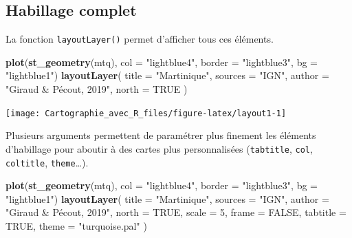 \documentclass[]{book}
\newenvironment{Shaded}{\begin{snugshade}}{\end{snugshade}}
\newcommand{\KeywordTok}[1]{\textcolor[rgb]{0.13,0.29,0.53}{\textbf{#1}}}
\newcommand{\DataTypeTok}[1]{\textcolor[rgb]{0.13,0.29,0.53}{#1}}
\newcommand{\DecValTok}[1]{\textcolor[rgb]{0.00,0.00,0.81}{#1}}
\newcommand{\StringTok}[1]{\textcolor[rgb]{0.31,0.60,0.02}{#1}}
\newcommand{\OtherTok}[1]{\textcolor[rgb]{0.56,0.35,0.01}{#1}}
\newcommand{\NormalTok}[1]{#1}
\begin{document}
\subsection{Habillage complet}\label{habillage-complet}

La fonction \texttt{layoutLayer()} permet d'afficher tous ces éléments.

\begin{Shaded}
\begin{Highlighting}[]
\KeywordTok{plot}\NormalTok{(}\KeywordTok{st_geometry}\NormalTok{(mtq), }\DataTypeTok{col =} \StringTok{"lightblue4"}\NormalTok{, }\DataTypeTok{border =} \StringTok{"lightblue3"}\NormalTok{, }
     \DataTypeTok{bg =} \StringTok{"lightblue1"}\NormalTok{)}
\KeywordTok{layoutLayer}\NormalTok{(}
  \DataTypeTok{title =} \StringTok{"Martinique"}\NormalTok{, }
  \DataTypeTok{sources =} \StringTok{"IGN"}\NormalTok{, }
  \DataTypeTok{author =} \StringTok{"Giraud & Pécout, 2019"}\NormalTok{,}
  \DataTypeTok{north =} \OtherTok{TRUE}
\NormalTok{)}
\end{Highlighting}
\end{Shaded}

\begin{center}\texttt{[image: Cartographie\_avec\_R\_files/figure-latex/layout1-1]} \end{center}

Plusieurs arguments permettent de paramétrer plus finement les éléments
d'habillage pour aboutir à des cartes plus personnalisées
(\texttt{tabtitle}, \texttt{col}, \texttt{coltitle},
\texttt{theme}\ldots{}).

\begin{Shaded}
\begin{Highlighting}[]
\KeywordTok{plot}\NormalTok{(}\KeywordTok{st_geometry}\NormalTok{(mtq), }\DataTypeTok{col =} \StringTok{"lightblue4"}\NormalTok{, }\DataTypeTok{border =} \StringTok{"lightblue3"}\NormalTok{, }
     \DataTypeTok{bg =} \StringTok{"lightblue1"}\NormalTok{)}
\KeywordTok{layoutLayer}\NormalTok{(}
  \DataTypeTok{title =} \StringTok{"Martinique"}\NormalTok{, }
  \DataTypeTok{sources =} \StringTok{"IGN"}\NormalTok{, }
  \DataTypeTok{author =} \StringTok{"Giraud & Pécout, 2019"}\NormalTok{,}
  \DataTypeTok{north =} \OtherTok{TRUE}\NormalTok{, }
  \DataTypeTok{scale =} \DecValTok{5}\NormalTok{,}
  \DataTypeTok{frame =} \OtherTok{FALSE}\NormalTok{, }
  \DataTypeTok{tabtitle =} \OtherTok{TRUE}\NormalTok{, }
  \DataTypeTok{theme =} \StringTok{"turquoise.pal"}
\NormalTok{)}
\end{Highlighting}
\end{Shaded}
\end{document}
